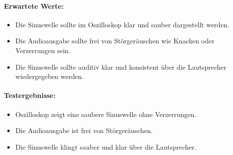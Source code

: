 \paragraph{Erwartete Werte:}
\begin{itemize}
	\item Die Sinuswelle sollte im Oszilloskop klar und sauber dargestellt werden.
	\item Die Audioausgabe sollte frei von Störgeräuschen wie Knacken oder Verzerrungen sein.
	\item Die Sinuswelle sollte auditiv klar und konsistent über die Lautsprecher wiedergegeben werden.
\end{itemize}

\paragraph{Testergebnisse:}
\begin{itemize}
	\item Oszilloskop zeigt eine saubere Sinuswelle ohne Verzerrungen.
	\item Die Audioausgabe ist frei von Störgeräuschen.
	\item Die Sinuswelle klingt sauber und klar über die Lautsprecher.
\end{itemize}

